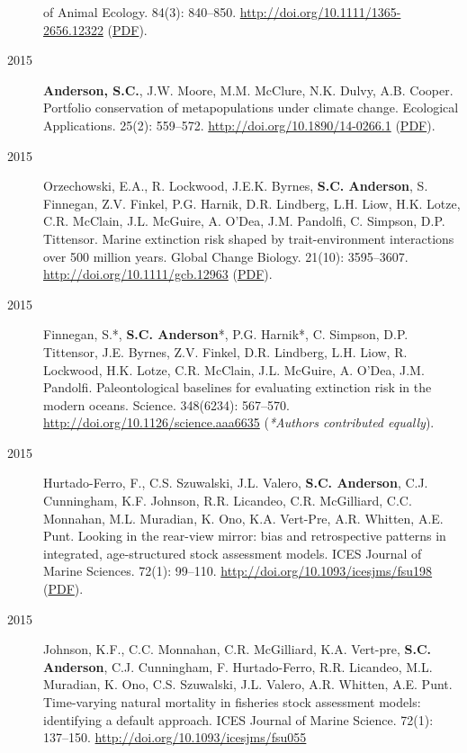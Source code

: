 \begin{description}
of Animal Ecology. 84(3): 840--850.
\url{http://doi.org/10.1111/1365-2656.12322}
(\href{https://dl.dropboxusercontent.com/u/254940/papers/Boudreau_etal_2015_lobster.pdf}{PDF}).
\item[2015]
\textbf{Anderson, S.C.}, J.W. Moore, M.M. McClure, N.K. Dulvy, A.B.
Cooper. Portfolio conservation of metapopulations under climate change.
Ecological Applications. 25(2): 559--572.
\url{http://doi.org/10.1890/14-0266.1}
(\href{https://dl.dropboxusercontent.com/u/254940/papers/Anderson_etal_2015_salmonportfolios.pdf}{PDF}).
\item[2015]
Orzechowski, E.A., R. Lockwood, J.E.K. Byrnes, \textbf{S.C. Anderson},
S. Finnegan, Z.V. Finkel, P.G. Harnik, D.R. Lindberg, L.H. Liow, H.K.
Lotze, C.R. McClain, J.L. McGuire, A. O'Dea, J.M. Pandolfi, C. Simpson,
D.P. Tittensor. Marine extinction risk shaped by trait-environment
interactions over 500 million years. Global Change Biology. 21(10):
3595--3607. \url{http://doi.org/10.1111/gcb.12963}
(\href{https://dl.dropboxusercontent.com/u/254940/papers/Orzechowski_etal_2015_paleometa.pdf}{PDF}).
\item[2015]
Finnegan, S.*, \textbf{S.C. Anderson}*, P.G. Harnik*, C. Simpson, D.P.
Tittensor, J.E. Byrnes, Z.V. Finkel, D.R. Lindberg, L.H. Liow, R.
Lockwood, H.K. Lotze, C.R. McClain, J.L. McGuire, A. O'Dea, J.M.
Pandolfi. Paleontological baselines for evaluating extinction risk in
the modern oceans. Science. 348(6234): 567--570.
\url{http://doi.org/10.1126/science.aaa6635} (\emph{*Authors contributed
equally}).
\item[2015]
Hurtado-Ferro, F., C.S. Szuwalski, J.L. Valero, \textbf{S.C. Anderson},
C.J. Cunningham, K.F. Johnson, R.R. Licandeo, C.R. McGilliard, C.C.
Monnahan, M.L. Muradian, K. Ono, K.A. Vert-Pre, A.R. Whitten, A.E. Punt.
Looking in the rear-view mirror: bias and retrospective patterns in
integrated, age-structured stock assessment models. ICES Journal of
Marine Sciences. 72(1): 99--110.
\url{http://doi.org/10.1093/icesjms/fsu198}
(\href{https://dl.dropboxusercontent.com/u/254940/papers/Hurtado-Ferro_etal_2014_retrospective.pdf}{PDF}).
\item[2015]
Johnson, K.F., C.C. Monnahan, C.R. McGilliard, K.A. Vert-pre,
\textbf{S.C. Anderson}, C.J. Cunningham, F. Hurtado-Ferro, R.R.
Licandeo, M.L. Muradian, K. Ono, C.S. Szuwalski, J.L. Valero, A.R.
Whitten, A.E. Punt. Time-varying natural mortality in fisheries stock
assessment models: identifying a default approach. ICES Journal of
Marine Science. 72(1): 137--150.
\url{http://doi.org/10.1093/icesjms/fsu055}

\end{description}
